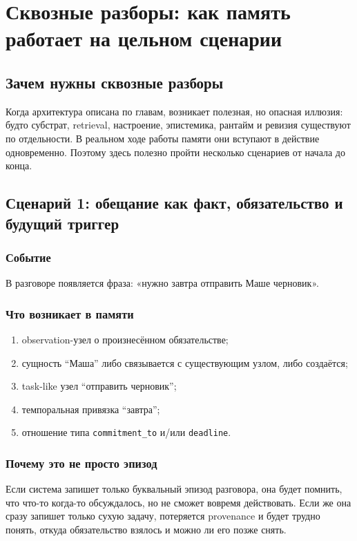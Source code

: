 \chapter{Сквозные разборы: как память работает на цельном сценарии}
\label{ch:casestudies}

\section{Зачем нужны сквозные разборы}

Когда архитектура описана по главам, возникает полезная, но опасная иллюзия: будто
субстрат, retrieval, настроение, эпистемика, рантайм и ревизия существуют по
отдельности. В реальном ходе работы памяти они вступают в действие одновременно.
Поэтому здесь полезно пройти несколько сценариев от начала до конца.

\section{Сценарий 1: обещание как факт, обязательство и будущий триггер}

\subsection*{Событие}
В разговоре появляется фраза: «нужно завтра отправить Маше черновик».

\subsection*{Что возникает в памяти}
\begin{enumerate}
\item observation-узел о произнесённом обязательстве;
\item сущность ``Маша'' либо связывается с существующим узлом, либо создаётся;
\item task-like узел ``отправить черновик'';
\item темпоральная привязка ``завтра'';
\item отношение типа \texttt{commitment\_to} и/или \texttt{deadline}.
\end{enumerate}

\subsection*{Почему это не просто эпизод}
Если система запишет только буквальный эпизод разговора, она будет помнить, что
что-то когда-то обсуждалось, но не сможет вовремя действовать. Если же она сразу
запишет только сухую задачу, потеряется provenance и будет трудно понять, откуда
обязательство взялось и можно ли его позже снять.

